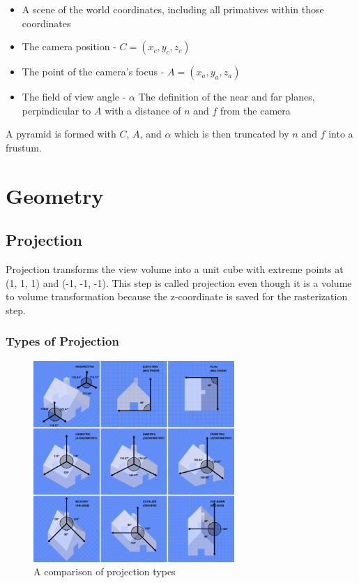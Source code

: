\documentclass{article}
\begin{document}
\begin{itemize}
\item A scene of the world coordinates, including all primatives within those coordinates
\item The camera position - $C = (x_{c}, y_{c}, z_{c})$
\item The point of the camera's focus - $A = (x_{a}, y_{a}, z_{a})$
\item The field of view angle - $\alpha$
\Item The definition of the near and far planes, perpindicular to $A$ with a distance of $n$ and $f$ from the camera
\end{itemize}

A pyramid is formed with $C$, $A$, and $\alpha$ which is then truncated by $n$ and $f$ into a frustum.

\section{Geometry}
\subsection{Projection}
Projection transforms the view volume into a unit cube with extreme points at (1, 1, 1) and (-1, -1, -1). This step is called projection even though it is a volume to volume transformation because the z-coordinate is saved for the rasterization step.

\subsubsection{Types of Projection}

\begin{figure}
    \centering
    \includegraphics[width=3.0in]{Graphical_projection_comparison.png}
    \caption{A comparison of projection types}
    \label{projectiontypes}
\end{figure}
\end{document}

